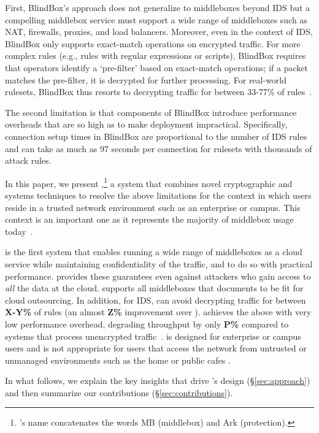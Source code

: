 First, BlindBox's approach does not generalize to middleboxes beyond IDS but a compelling middlebox service must support a wide range of middleboxes such as 
NAT, firewalls, proxies, and load balancers. Moreover, even in the context of IDS, BlindBox only supports exact-match operations on encrypted traffic. 
For more complex rules (e.g., rules with regular expressions or scripts), BlindBox requires that operators identify a `pre-filter' based on 
exact-match operations; if a packet matches the pre-filter, it is decrypted for further processing. For real-world rulesets, BlindBox thus resorts
 to decrypting traffic for between 33-77\% of rules~\cite{blindbox}. 

The second limitation is that components of BlindBox introduce performance overheads that are so high as to make deployment impractical. 
Specifically, connection setup times in BlindBox are proportional to the number of IDS rules and can take as much as 97 seconds per connection 
for rulesets with thousands of attack rules. 

In this paper, we present \sys,\footnote{\sys's name concatenates the words MB (middlebox) and Ark (protection).}
 a system that combines novel cryptographic and systems techniques to resolve the above limitations for 
 the context in which users reside in a trusted network environment such as an enterprise or campus. 
This context is an important one as it represents the majority of middlebox usage today~\cite{need-citation}. 

\sys is the first system that enables running a wide range of middleboxes as a cloud service while maintaining confidentiality of the traffic, 
and to do so with practical performance. 
\sys provides these guarantees even against attackers who gain access to {\em all} the data at the cloud. 
\sys supports all middleboxes that \cite{aplomb} documents to be fit for cloud outsourcing.   
In addition, for IDS, \sys can avoid decrypting traffic for between {\bf X-Y\%} of rules (an almost {\bf Z\%} improvement over \cite{blindbox}). 
\sys achieves the above with very low performance overhead, degrading throughput by only {\bf P\%} compared to systems that 
process unencrypted traffic~\cite{aplomb}. 
\sys is designed for enterprise or campus users and is not appropriate for users that access the network from untrusted or unmanaged environments 
such as the home or public cafes . 

In what follows, we explain the key insights that drive \sys's design (\S\ref{sec:approach}) and then summarize our contributions (\S\ref{sec:contributions}). 



